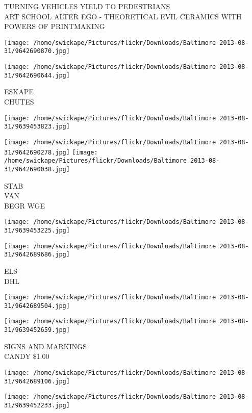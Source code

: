 \documentclass[10pt,letterpaper]{article}
\begin{document}
TURNING VEHICLES YIELD TO PEDESTRIANS\\
ART SCHOOL ALTER EGO {-} THEORETICAL EVIL CERAMICS WITH POWERS OF PRINTMAKING
\pagebreak

\texttt{[image: /home/swickape/Pictures/flickr/Downloads/Baltimore 2013-08-31/9642690870.jpg]}

\vspace{0.25in}
\texttt{[image: /home/swickape/Pictures/flickr/Downloads/Baltimore 2013-08-31/9642690644.jpg]}

ESKAPE\\
CHUTES
\pagebreak

\texttt{[image: /home/swickape/Pictures/flickr/Downloads/Baltimore 2013-08-31/9639453823.jpg]}

\vspace{0.25in}
\texttt{[image: /home/swickape/Pictures/flickr/Downloads/Baltimore 2013-08-31/9642690278.jpg]}
\texttt{[image: /home/swickape/Pictures/flickr/Downloads/Baltimore 2013-08-31/9642690038.jpg]}

STAB\\
VAN\\
BEGR WGE
\pagebreak

\texttt{[image: /home/swickape/Pictures/flickr/Downloads/Baltimore 2013-08-31/9639453225.jpg]}

\vspace{0.25in}
\texttt{[image: /home/swickape/Pictures/flickr/Downloads/Baltimore 2013-08-31/9642689686.jpg]}

ELS\\
DHL
\pagebreak

\texttt{[image: /home/swickape/Pictures/flickr/Downloads/Baltimore 2013-08-31/9642689504.jpg]}

\vspace{0.25in}
\texttt{[image: /home/swickape/Pictures/flickr/Downloads/Baltimore 2013-08-31/9639452659.jpg]}

SIGNS AND MARKINGS\\
CANDY \$1.00
\pagebreak

\texttt{[image: /home/swickape/Pictures/flickr/Downloads/Baltimore 2013-08-31/9642689106.jpg]}

\vspace{0.25in}
\texttt{[image: /home/swickape/Pictures/flickr/Downloads/Baltimore 2013-08-31/9639452233.jpg]}
\end{document}

